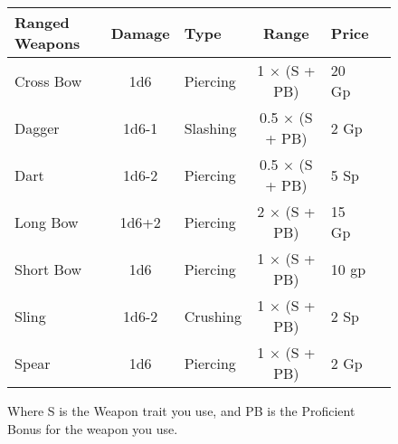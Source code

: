 \begin{figure}


\begin{tabular}{|l|c|l|c|l|c|}\hline
\rowcolor{gray!50}
    \textbf{Ranged Weapons}&\textbf{Damage}&\textbf{Type}&\textbf{Range}&\textbf{Price} \\ \hline
    Cross Bow   & 1d6   & Piercing  & 1 $\times$ (S + PB)   & 20 Gp     \\ 
    Dagger      & 1d6-1 & Slashing  & 0.5 $\times$ (S + PB) & 2 Gp      \\ 
    Dart        & 1d6-2 & Piercing  & 0.5 $\times$ (S + PB) & 5 Sp      \\ 
    Long Bow    & 1d6+2 & Piercing  & 2 $\times$ (S + PB)   & 15 Gp     \\ 
    Short Bow   & 1d6   & Piercing  & 1 $\times$ (S + PB)   & 10 gp     \\ 
    Sling       & 1d6-2 & Crushing  & 1 $\times$ (S + PB)   & 2 Sp      \\ 
    Spear       & 1d6   & Piercing  & 1 $\times$ (S + PB)   & 2 Gp      \\ 
    \hline
\end{tabular}
\caption{Where S is the Weapon trait you use, and PB is the Proficient Bonus for the weapon you use.}
\end{figure}